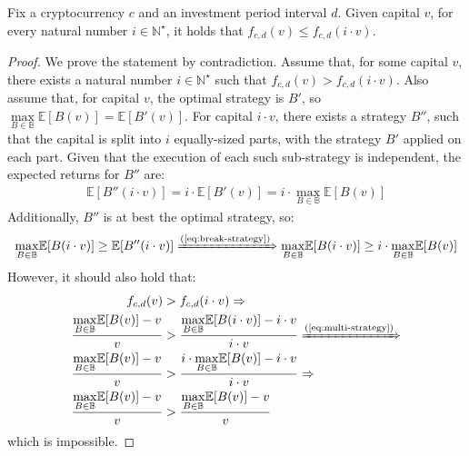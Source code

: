 \begin{corollary}\label{cor:sybil}
    Fix a cryptocurrency $c$ and an investment period interval $d$. Given
    capital $v$, for every natural number $i \in \mathbb{N}^\star$, it holds
    that $f_{c,d}(v) \leq f_{c, d}(i \cdot v)$.
\end{corollary}
\begin{proof}
    We prove the statement by contradiction. Assume that, for some capital $v$,
    there exists a natural number $i \in \mathbb{N}^\star$ such that
    $f_{c,d}(v) > f_{c,d}(i \cdot v)$. Also assume that, for capital $v$, the
    optimal strategy is $B'$, so $\underset{B \in
    \mathbb{B}}{\max}{\mathbb{E}[B(v)]} = \mathbb{E}[B'(v)]$. For capital $i
    \cdot v$, there exists a strategy $B''$, such that the capital is split
    into $i$ equally-sized parts, with the strategy $B'$ applied on each part.
    Given that the execution of each such sub-strategy is independent, the
    expected returns for $B''$ are:
    \begin{align}\label{eq:break-strategy}
        \mathbb{E}[B''(i \cdot v)] = i \cdot \mathbb{E}[B'(v)]  = i \cdot \underset{B \in \mathbb{B}}{\max}{\mathbb{E}[B(v)]}
    \end{align}
    Additionally, $B''$ is at best the optimal strategy, so:
    \begin{align}\label{eq:multi-strategy}
        \underset{B \in \mathbb{B}}{\max}{\mathbb{E}[B(i \cdot v)]} \geq \mathbb{E}[B''(i \cdot v)] \xRightarrow{\text{(\ref{eq:break-strategy})}}
        \underset{B \in \mathbb{B}}{\max}{\mathbb{E}[B(i \cdot v)]} \geq i \cdot \underset{B \in \mathbb{B}}{\max}{\mathbb{E}[B(v)]}
    \end{align}
    However, it should also hold that:
    \begin{alignat}{2}
        f_{c,d}(v) &> f_{c,d}(i \cdot v) \Rightarrow \notag\\
        \frac{\underset{B \in \mathbb{B}}{\max}{\mathbb{E}[B(v)]} - v}{v} &> \frac{\underset{B \in \mathbb{B}}{\max}{\mathbb{E}[B(i \cdot v)]} - i \cdot v}{i \cdot v} \xRightarrow{\text{(\ref{eq:multi-strategy})}} \notag\\
        \frac{\underset{B \in \mathbb{B}}{\max}{\mathbb{E}[B(v)]} - v}{v} &> \frac{i \cdot \underset{B \in \mathbb{B}}{\max}{\mathbb{E}[B(v)]} - i \cdot v}{i \cdot v} \Rightarrow \notag\\
        \frac{\underset{B \in \mathbb{B}}{\max}{\mathbb{E}[B(v)]} - v}{v} &> \frac{\underset{B \in \mathbb{B}}{\max}{\mathbb{E}[B(v)]} - v}{v} \notag
    \end{alignat}
    which is impossible.
\end{proof}

